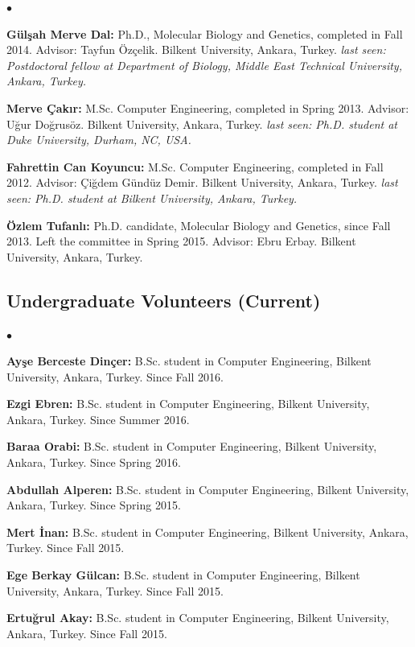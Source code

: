 \documentclass[margin,line]{res}
\newenvironment{list2}{
  \begin{list}{$\bullet$}{%
      \setlength{\itemsep}{0in}
      \setlength{\parsep}{0in} \setlength{\parskip}{0in}
      \setlength{\topsep}{0in} \setlength{\partopsep}{0in} 
      \setlength{\leftmargin}{0.2in}}}{\end{list}}
\begin{document}
\begin{resume}
\begin{list2}
\item
  {\bf G\"{u}l\c{s}ah Merve Dal:} Ph.D., Molecular Biology and Genetics, completed in Fall 2014.
  Advisor: Tayfun Özçelik.
  Bilkent University, Ankara, Turkey. {\it last seen: Postdoctoral fellow at Department of Biology, Middle East Technical University, Ankara, Turkey.}
\item
  {\bf Merve Çakır:} M.Sc. Computer Engineering, completed in Spring 2013. Advisor: Uğur Doğrusöz.
  Bilkent University, Ankara, Turkey. {\it last seen: Ph.D. student at Duke University, Durham, NC, USA.}
\item
  {\bf Fahrettin Can Koyuncu:} M.Sc. Computer Engineering, completed in Fall 2012. Advisor: Çiğdem Gündüz Demir.
  Bilkent University, Ankara, Turkey. {\it last seen: Ph.D. student at Bilkent University, Ankara, Turkey.}
\item
  {\bf Özlem Tufanlı:} Ph.D. candidate, Molecular Biology and Genetics, since Fall 2013. Left the committee in Spring 2015.
  Advisor: Ebru Erbay.
  Bilkent University, Ankara, Turkey.
  \end{list2}

  \vspace*{-.6cm}
  \subsection{\small \sc Undergraduate Volunteers (Current)}
  \begin{list2}
    \item 
      {\bf Ayşe Berceste Dinçer:} B.Sc. student in Computer Engineering,  Bilkent University, Ankara, Turkey. Since Fall 2016. 
    \item 
      {\bf Ezgi Ebren:} B.Sc. student in Computer Engineering,  Bilkent University, Ankara, Turkey. Since Summer 2016. 
    \item 
      {\bf Baraa Orabi:} B.Sc. student in Computer Engineering,  Bilkent University, Ankara, Turkey. Since Spring 2016. 
    \item 
      {\bf Abdullah Alperen:} B.Sc. student in Computer Engineering,  Bilkent University, Ankara, Turkey. Since Spring 2015. 
    \item 
      {\bf Mert İnan:} B.Sc. student in Computer Engineering,  Bilkent University, Ankara, Turkey. Since Fall 2015. 
    \item 
      {\bf Ege Berkay Gülcan:} B.Sc. student in Computer Engineering,  Bilkent University, Ankara, Turkey. Since Fall 2015. 
    \item 
      {\bf Ertuğrul Akay:} B.Sc. student in Computer Engineering,  Bilkent University, Ankara, Turkey. Since Fall 2015. 
  \end{list2}


\end{resume}
\end{document}
